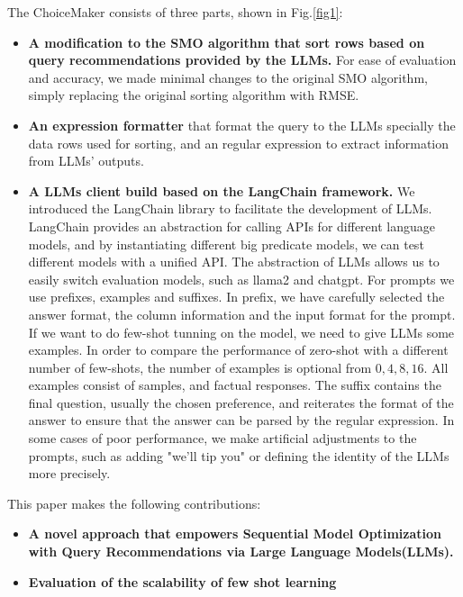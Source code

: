 \documentclass{ieeeaccess}
\begin{document}
The ChoiceMaker consists of three parts, shown in Fig.\ref{fig1}: 
\begin{itemize}

\item \textbf{A modification to the SMO algorithm that sort rows based on query recommendations provided by the LLMs.}
For ease of evaluation and accuracy, we made minimal changes to the original SMO algorithm, simply replacing the original sorting algorithm with RMSE.

\item \textbf{An expression formatter}
that format the query to the LLMs specially the data rows used for sorting, and an regular expression to extract information from LLMs' outputs.

\item \textbf{A LLMs client build based on the LangChain framework.}
We introduced the LangChain library to facilitate the development of LLMs. LangChain provides an abstraction for calling APIs for different language models, and by instantiating different big predicate models, we can test different models with a unified API. The abstraction of LLMs allows us to easily switch evaluation models, such as llama2 and chatgpt. For prompts we use prefixes, examples and suffixes. In prefix, we have carefully selected the answer format, the column information and the input format for the prompt. If we want to do few-shot tunning on the model, we need to give LLMs some examples. In order to compare the performance of zero-shot with a different number of few-shots, the number of examples is optional from ${0,4,8,16}$. All examples consist of samples, and factual responses. The suffix contains the final question, usually the chosen preference, and reiterates the format of the answer to ensure that the answer can be parsed by the regular expression. In some cases of poor performance, we make artificial adjustments to the prompts, such as adding "we'll tip you" or defining the identity of the LLMs more precisely.
   
\end{itemize}

This paper makes the following contributions:
\begin{itemize}
    \item \textbf{A novel approach that empowers Sequential Model Optimization with Query Recommendations via Large Language Models(LLMs).}
    \item \textbf{Evaluation of the scalability of few shot learning}
\end{itemize}
\end{document}
